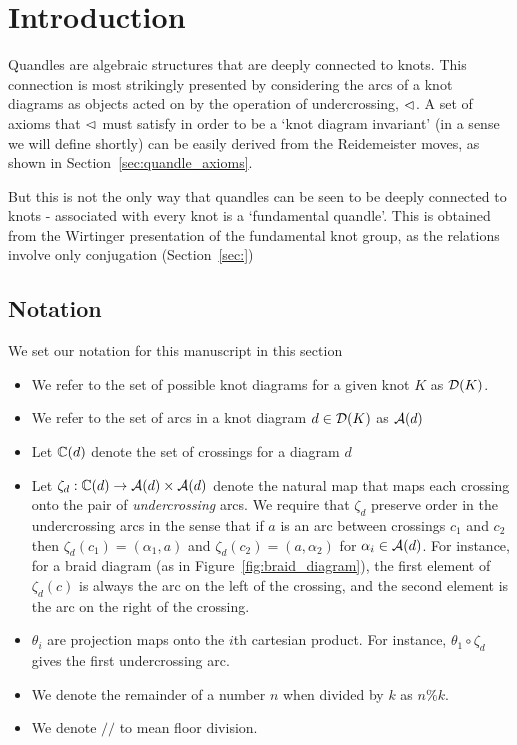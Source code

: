 \documentclass[paper.tex]{subfiles}
\begin{document}
\section{Introduction}
\label{sec:intro}

Quandles are algebraic structures that are deeply connected to knots. This connection is most strikingly presented by considering the arcs of a knot diagrams as objects acted on by the operation of
undercrossing, $\vartriangleleft$. A set of axioms that $\vartriangleleft$ must satisfy in order to be a `knot diagram invariant' (in a sense we will define shortly) can be easily derived from the Reidemeister moves, as shown in
Section~\ref{sec:quandle_axioms}.

But this is not the only way that quandles can be seen to be deeply connected to knots - associated with every knot is a `fundamental quandle'. This is obtained from the Wirtinger presentation of the fundamental knot group,
as the relations involve only conjugation (Section~\ref{sec:})

\subsection{Notation}

We set our notation for this manuscript in this section

\begin{itemize}
  \item We refer to the set of possible knot diagrams for a given knot $K$ as $\operatorname{\mathcal{D}}(K)$.
  \item We refer to the set of arcs in a knot diagram $d \in \operatorname{\mathcal{D}}(K)$ as $\mathcal{A}(d)$
  \item Let $\mathbb{C}(d)$ denote the set of crossings for a diagram $d$
  \item Let $\zeta_d: \mathbb{C}(d) \to \mathcal{A}(d) \times \mathcal{A}(d)$ denote the natural map that maps each crossing onto the pair of
    \emph{undercrossing} arcs. We require that $\zeta_d$ preserve order in the undercrossing arcs in the
    sense that if $a$ is an arc between crossings $c_1$ and $c_2$ then $\zeta_d(c_1) = (\alpha_1, a)$ and $\zeta_d(c_2) = (a, \alpha_2)$ for
    $\alpha_i \in \mathcal{A}(d)$. For instance, for a braid diagram (as in Figure~\ref{fig:braid_diagram}), the first element of $\zeta_d(c)$ is always the arc on the left of the crossing,
    and the second element is the arc on the right of the crossing.
  \item $\theta_i$ are projection maps onto the $i$th cartesian product. For instance, $\theta_1 \circ \zeta_d$ gives the first undercrossing arc.
  \item We denote the remainder of a number $n$ when divided by $k$ as $n\%k$.
  \item We denote $//$ to mean floor division.
\end{itemize}
\end{document}
